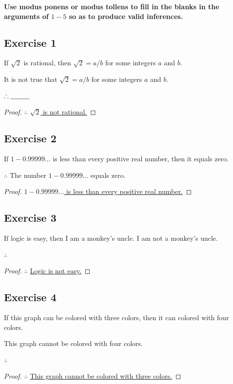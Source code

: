 \documentclass[14pt]{extarticle}
\begin{document}
{\bf \color{cyan} Use modus ponens or modus tollens to fill in the blanks in the
arguments of $1-5$ so as to produce valid inferences.}

\subsection{Exercise 1} If $\sqrt{2}$ is rational, then $\sqrt{2} = a / b$ for
some integers $a$ and $b$.

It is not true that $\sqrt{2} = a / b$ for some integers $a$ and $b$.

$\therefore \underline{\hspace{1cm}}\,\,$

\begin{proof} $\therefore$ \underline{$\sqrt{2}$ is not rational.} \end{proof}
\subsection{Exercise 2} If $1 - 0.99999\ldots$ is less than every positive real
number, then it equals zero.

\fbl

$\therefore$ The number $1 - 0.99999\ldots$ equals zero.

\begin{proof} \underline{$1 - 0.99999\ldots$ is less than every positive real
number.} \end{proof}

\subsection{Exercise 3} If logic is easy, then I am a monkey’s uncle.
I am not a monkey’s uncle.

$\therefore$ \fbl

\begin{proof} $\therefore$ \underline{Logic is not easy.} \end{proof}
\subsection{Exercise 4} If this graph can be colored with three colors, then it
can colored with four colors.

This graph cannot be colored with four colors.

$\therefore$ \fbl

\begin{proof} $\therefore$ \underline{This graph cannot be colored with three
colors.} \end{proof}
\end{document}
